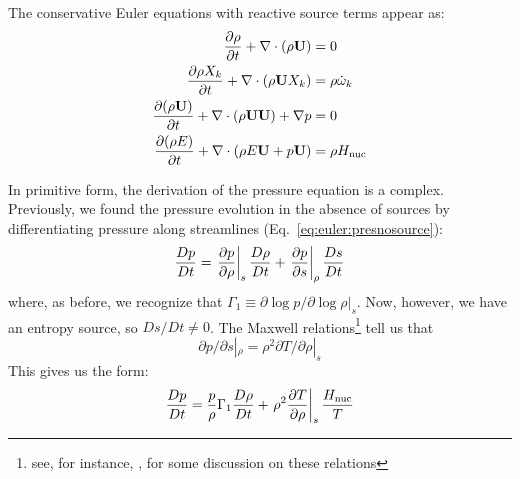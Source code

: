 The conservative Euler equations with reactive source terms
appear as:
\begin{align}
{\frac{{\partial\rho}}{\partial t}} + \nabla \cdot (\rho {\bf U}) &= 0 \\
{\frac{{\partial\rho X_k}}{\partial t}} + \nabla \cdot (\rho {\bf U} X_k) &= \rho {\dot{\omega}}_k \\
{\frac{{\partial(\rho {\bf U})}}{\partial t}} + \nabla \cdot (\rho {\bf U} {\bf U}) + \nabla p &= 0 \\
{\frac{{\partial(\rho E)}}{\partial t}} + \nabla \cdot (\rho E {\bf U} + p {\bf U} ) &= \rho {H_\mathrm{nuc}}
\end{align}

In primitive form, the derivation of the pressure equation is a
complex.  Previously, we found the pressure evolution in the absence
of sources by differentiating pressure along streamlines
(Eq.~\ref{eq:euler:presnosource}):
\begin{equation}
\frac{Dp}{Dt} = \left . \frac{\partial p}{\partial \rho} \right |_s
     {\frac{{D\rho}}{D t}} + 
     \left . \frac{\partial p}{\partial s} \right |_\rho
     {\frac{{Ds}}{D t}}
\end{equation}
where, as before, we recognize that $\Gamma_1 \equiv \partial \log p/\partial \log \rho |_s$.
Now, however, we have an entropy source, so $Ds/Dt \ne 0$.  
The Maxwell relations\footnote{see, for instance, \cite{shu}, for some discussion
on these relations} tell us that
\begin{equation}
\partial p/\partial s |_\rho = \rho^2 \partial T/\partial \rho |_s
\end{equation}
This gives us the form:
\begin{equation}
\frac{Dp}{Dt} = \frac{p}{\rho} \Gamma_1 \frac{D\rho}{Dt} +
     \left . \rho^2 \frac{\partial T}{\partial \rho} \right |_s
     \frac{{H_\mathrm{nuc}}}{T}
\end{equation}

